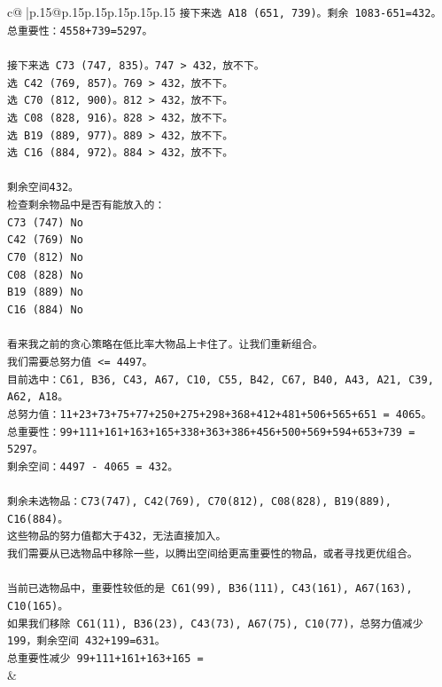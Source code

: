 \documentclass{article}
\begin{document}
{\begin{supertabular}{c@{$\;$}|p{.15\linewidth}@{}p{.15\linewidth}p{.15\linewidth}p{.15\linewidth}p{.15\linewidth}p{.15\linewidth}}
{{{\texttt{接下来选 A18 (651, 739)。剩余 1083{-}651=432。} \\
\texttt{总重要性：4558+739=5297。} \\
\\ 
\texttt{接下来选 C73 (747, 835)。747 > 432，放不下。} \\
\texttt{选 C42 (769, 857)。769 > 432，放不下。} \\
\texttt{选 C70 (812, 900)。812 > 432，放不下。} \\
\texttt{选 C08 (828, 916)。828 > 432，放不下。} \\
\texttt{选 B19 (889, 977)。889 > 432，放不下。} \\
\texttt{选 C16 (884, 972)。884 > 432，放不下。} \\
\\ 
\texttt{剩余空间432。} \\
\texttt{检查剩余物品中是否有能放入的：} \\
\texttt{C73 (747) No} \\
\texttt{C42 (769) No} \\
\texttt{C70 (812) No} \\
\texttt{C08 (828) No} \\
\texttt{B19 (889) No} \\
\texttt{C16 (884) No} \\
\\ 
\texttt{看来我之前的贪心策略在低比率大物品上卡住了。让我们重新组合。} \\
\texttt{我们需要总努力值 <= 4497。} \\
\texttt{目前选中：C61, B36, C43, A67, C10, C55, B42, C67, B40, A43, A21, C39, A62, A18。} \\
\texttt{总努力值：11+23+73+75+77+250+275+298+368+412+481+506+565+651 = 4065。} \\
\texttt{总重要性：99+111+161+163+165+338+363+386+456+500+569+594+653+739 = 5297。} \\
\texttt{剩余空间：4497 {-} 4065 = 432。} \\
\\ 
\texttt{剩余未选物品：C73(747), C42(769), C70(812), C08(828), B19(889), C16(884)。} \\
\texttt{这些物品的努力值都大于432，无法直接加入。} \\
\texttt{我们需要从已选物品中移除一些，以腾出空间给更高重要性的物品，或者寻找更优组合。} \\
\\ 
\texttt{当前已选物品中，重要性较低的是 C61(99), B36(111), C43(161), A67(163), C10(165)。} \\
\texttt{如果我们移除 C61(11), B36(23), C43(73), A67(75), C10(77)，总努力值减少 199，剩余空间 432+199=631。} \\
\texttt{总重要性减少 99+111+161+163+165 =} \\
            }
        }
    }
    & \\ \\


\end{supertabular}}
\end{document}
